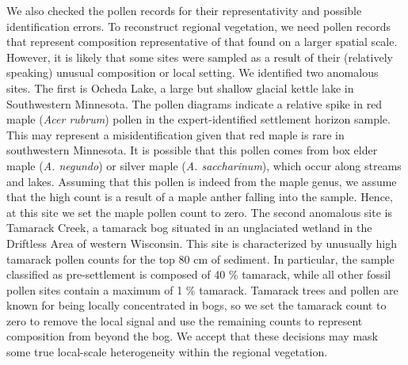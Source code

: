 \documentclass[12pt]{article}
\begin{document}
We also checked the pollen records for their representativity and
possible identification errors. To reconstruct regional vegetation, we
need pollen records that represent composition representative of that
found on a larger spatial scale. However, it is likely that some sites
were sampled as a result of their (relatively speaking) unusual
composition or local setting. We identified two anomalous sites. The
first is Ocheda Lake, a large but shallow glacial kettle lake in
Southwestern Minnesota. The pollen diagrams indicate a relative spike
in red maple (\textit{Acer rubrum}) pollen in the expert-identified
settlement horizon sample. This may represent a misidentification
given that red maple is rare in southwestern Minnesota. It is possible
that this pollen comes from box elder maple (\textit{A. negundo}) or
silver maple (\textit{A. saccharinum}), which occur along streams and
lakes. Assuming that this pollen is indeed from the maple genus, we
assume that the high count is a result of a maple anther falling into
the sample. Hence, at this site we set the maple pollen count to
zero. The second anomalous site is Tamarack Creek, a tamarack bog
situated in an unglaciated wetland in the Driftless Area of western
Wisconsin. This site is characterized by unusually high tamarack
pollen counts for the top 80 cm of sediment. In particular, the sample
classified as pre-settlement is composed of 40 \% tamarack, while all
other fossil pollen sites contain a maximum of 1 \% tamarack. Tamarack
trees and pollen are known for being locally concentrated in bogs, so
we set the tamarack count to zero to remove the local signal and use
the remaining counts to represent composition from beyond the bog. We
accept that these decisions may mask some true local-scale
heterogeneity within the regional vegetation.

\end{document}
